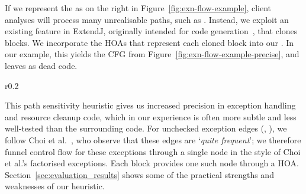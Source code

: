 If we represent the {\CFG} as on the right in Figure~\ref{fig:exn-flow-example}, client analyses will process
many unrealisable paths, such as
\succarrow{}\succarrow{}\succarrow{}.
Instead, we exploit an existing feature in ExtendJ,
originally intended for code generation~\cite{oqvist2018contributions},
that clones  blocks.
We incorporate the HOAs that represent each cloned
block into our {\CFG}.  In our example, this yields the CFG from
Figure~\ref{fig:exn-flow-example-precise}, and leaves  as
dead code.
%
\begin{wrapfigure}{r}{0.2\textwidth}
\caption{Path-sensitive variant of the {\CFG} from Figure~\ref{fig:exn-flow-example}, used in {\intraj}.}
\label{fig:exn-flow-example-precise}
\end{wrapfigure}
%
This path sensitivity heuristic gives us increased precision in exception handling
and resource cleanup code, which in our experience is often more subtle and less well-tested
than the surrounding code.
For unchecked exception edges (, ),
we follow Choi et al.~\cite{choi1999efficient}, who observe
that these edges are `\emph{quite frequent}'; we therefore
funnel control flow for these exceptions through a single node 
in the style of Choi et al.'s factorised exceptions.
Each  block provides one such node through a HOA.
Section~\ref{sec:evaluation_results} shows some of the practical strengths and weaknesses of our heuristic.

